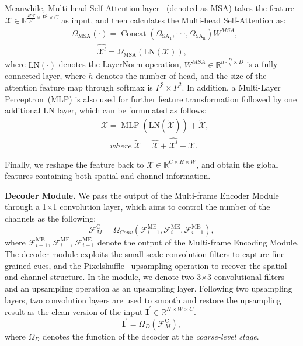 \documentclass[journal]{IEEEtran}
\begin{document}
Meanwhile, Multi-head Self-Attention layer~\cite{vaswani2017attention} (denoted as MSA) takes the feature $\mathcal{X} \in \mathbb{R}^{\frac{H W}{P^{2}} \times {P^{2} \times C}}$ as input, and then calculates the Multi-head Self-Attention as:
\begin{equation}
\begin{aligned}
&\Omega_{\operatorname{MSA}}(\cdot)=\operatorname{Concat}(\Omega_{\operatorname{SA_1}},\cdot\cdot\cdot,\Omega_{\operatorname{SA_h}}){W}^{MSA},\\
&~~~~~~~~~~~~~~\hat{\mathcal{X}^{l}}=\Omega_{\operatorname{MSA}}\left(\mathrm{LN}\left(\mathcal{X}\right)\right),
\end{aligned}
\end{equation}
where $\mathrm{LN}(\cdot)$ denotes the LayerNorm operation,  ${W}^{MSA} \in {\mathbb{R}^{h \cdot {\frac{D}{h}}  \times D}}$ is a fully connected layer, where $h$ denotes the number of head, and the size of the attention feature map through softmax is ${ {P^{2}} \times {P^{2}}}$. In addition, a Multi-Layer Perceptron~(MLP) is also used for further feature transformation followed by one additional LN layer, which can be formulated as follows:
\begin{equation}
\begin{aligned}
&\mathcal{X}=\operatorname{MLP}(\mathrm{LN}({\tilde{\mathcal{X}}}))+{\tilde{\mathcal{X}}}, \\
& ~~~~~where~\tilde{\mathcal{X}}= \hat{\mathcal{X}}+\hat{\mathcal{X}^{l}}+{\mathcal{X}}.
\end{aligned}
\end{equation}

Finally, we reshape the feature back to $\mathcal{X} \in {\mathbb{R}^{C \times H \times W}}$, and obtain the global features containing both spatial and channel information.

\noindent
\textbf{Decoder Module.} 
We pass the output of the Multi-frame Encoder Module through a 1$\times$1 convolution layer, which aims to control the number of the channels as the following:
\begin{equation}
 \mathcal{F}_{M}^{\text {C}} = \Omega_{Conv}(\mathcal{F}_{i-1}^\text{ME}, \mathcal{F}_{i}^\text{ME}, \mathcal{F}_{i+1}^\text{ME}),
\end{equation}
where $\mathcal{F}_{i-1}^\text{ME}$, $\mathcal{F}_{i}^\text{ME}$, $\mathcal{F}_{i+1}^\text{ME}$ denote the output of the Multi-frame Encoding Module. The decoder module exploits the small-scale convolution filters to capture fine-grained cues, and the Pixelshuffle~\cite{7780576} upsampling operation to recover the spatial and channel structure. In the module, we denote two 3$\times$3 convolutional filters and an upsampling operation as an upsampling layer. Following two upsampling layers, two convolution layers are used to smooth and restore the upsampling result as the clean version of the input $\mathbf{I}^{\prime} \in \mathbb{R}^{H \times W \times C}$.
\begin{equation}
\mathbf{I}^{\prime}=\Omega_{D}\left( \mathcal{F}_{M}^{\text {C}}\right),
\end{equation}
where $\Omega_{D}$ denotes the function of the decoder at the \emph{coarse-level stage}.
\end{document}
